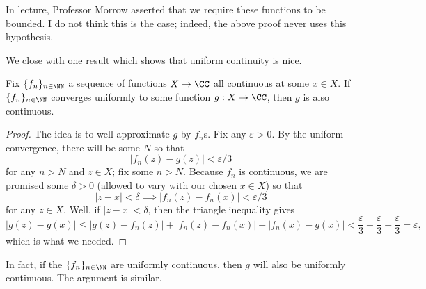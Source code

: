 \begin{remark}
	In lecture, Professor Morrow asserted that we require these functions to be bounded. I do not think this is the case; indeed, the above proof never uses this hypothesis.
\end{remark}
We close with one result which shows that uniform continuity is nice.
\begin{proposition}
	Fix $\{f_n\}_{n\in\NN}$ a sequence of functions $X\to\CC$ all continuous at some $x\in X$. If $\{f_n\}_{n\in\NN}$ converges uniformly to some function $g:X\to\CC$, then $g$ is also continuous.
\end{proposition}
\begin{proof}
	The idea is to well-approximate $g$ by $f_n$s. Fix any $\varepsilon>0$. By the uniform convergence, there will be some $N$ so that
	\[|f_n(z)-g(z)|<\varepsilon/3\]
	for any $n>N$ and $z\in X$; fix some $n>N$. Because $f_n$ is continuous, we are promised some $\delta>0$ (allowed to vary with our chosen $x\in X$) so that
	\[|z-x|<\delta\implies|f_n(z)-f_n(x)|<\varepsilon/3\]
	for any $z\in X$. Well, if $|z-x|<\delta$, then the triangle inequality gives
	\[|g(z)-g(x)|\le|g(z)-f_n(z)|+|f_n(z)-f_n(x)|+|f_n(x)-g(x)|<\frac\varepsilon3+\frac\varepsilon3+\frac\varepsilon3=\varepsilon,\]
	which is what we needed.
\end{proof}
\begin{remark}[Nir]
	In fact, if the $\{f_n\}_{n\in\NN}$ are uniformly continuous, then $g$ will also be uniformly continuous. The argument is similar.
\end{remark}